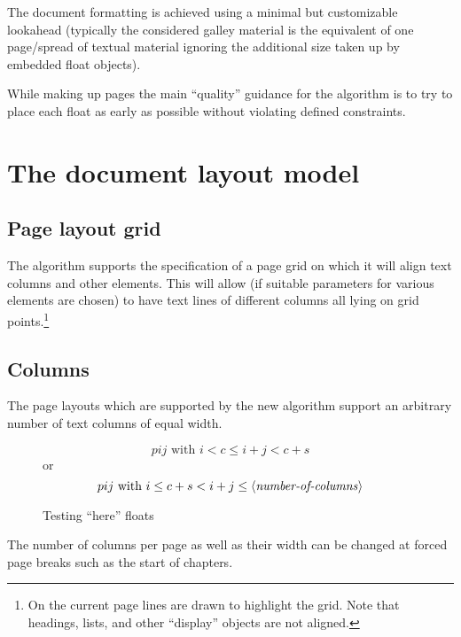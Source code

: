 \documentclass[twocolumn]{article}
\newcommand\meta[1]{\mbox{$\langle$\textit{#1}$\rangle$}}
\begin{document}
The document formatting is achieved using a minimal but customizable
lookahead (typically the considered galley material is the equivalent
of one page/\allowbreak spread of textual material ignoring the
additional size taken up by embedded float objects).

While making up pages the main ``quality'' guidance for the algorithm
is to try to place each float as early as possible without violating
defined constraints.


\ORspecial\ShowGridtrue


\section{The document layout model}

\subsection{Page layout grid}

The algorithm supports the specification of a page grid on which it
will align text columns and other elements.  This will allow (if
suitable parameters for various elements are chosen) to have text
lines of different columns all lying on grid points.\footnote{On the
current page lines are drawn to highlight the grid. Note that
headings, lists, and other ``display'' objects are not aligned.}

\subsection{Columns}

The page layouts which are supported by the new algorithm support
an arbitrary number of text columns of equal width.

\tracefloats 
{}

\begin{figure}[h]
\begin{minipage}{\columnwidth}
\vspace*{-2\baselineskip}
\tiny %
\[
   pij  \textrm{ with }   i < c \leq i+j < c+s
\]
or
\[
   pij  \textrm{ with }   i \leq c+s < i+j \leq 
                            \mbox{\meta{number-of-columns}}
\]
\end{minipage}
\caption{Testing ``here'' floats}
\end{figure}

The number of columns per page as well as their width can be changed
at forced page breaks such as the start of chapters.
\end{document}
